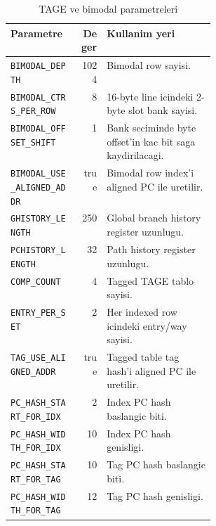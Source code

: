 \documentclass[11pt,a4paper]{article}
\newcommand{\param}[1]{\texttt{#1}}
\begin{document}
\begin{table}[!htbp]
\centering
\caption{TAGE ve bimodal parametreleri}
\label{tab:tage-params}
\small
\begin{tabularx}{\linewidth}{@{}>{\raggedright\arraybackslash}p{0.34\linewidth}rY@{}}
\toprule
Parametre & Deger & Kullanim yeri \\
\midrule
\param{BIMODAL\_DEPTH} & 1024 & Bimodal row sayisi. \\
\param{BIMODAL\_CTRS\_PER\_ROW} & 8 & 16-byte line icindeki 2-byte slot bank sayisi. \\
\param{BIMODAL\_OFFSET\_SHIFT} & 1 & Bank seciminde byte offset'in kac bit saga kaydirilacagi. \\
\param{BIMODAL\_USE\_ALIGNED\_ADDR} & true & Bimodal row index'i aligned PC ile uretilir. \\
\param{GHISTORY\_LENGTH} & 250 & Global branch history register uzunlugu. \\
\param{PCHISTORY\_LENGTH} & 32 & Path history register uzunlugu. \\
\param{COMP\_COUNT} & 4 & Tagged TAGE tablo sayisi. \\
\param{ENTRY\_PER\_SET} & 2 & Her indexed row icindeki entry/way sayisi. \\
\param{TAG\_USE\_ALIGNED\_ADDR} & true & Tagged table tag hash'i aligned PC ile uretilir. \\
\param{PC\_HASH\_START\_FOR\_IDX} & 2 & Index PC hash baslangic biti. \\
\param{PC\_HASH\_WIDTH\_FOR\_IDX} & 10 & Index PC hash genisligi. \\
\param{PC\_HASH\_START\_FOR\_TAG} & 10 & Tag PC hash baslangic biti. \\
\param{PC\_HASH\_WIDTH\_FOR\_TAG} & 12 & Tag PC hash genisligi. \\
\bottomrule
\end{tabularx}
\end{table}
\end{document}
